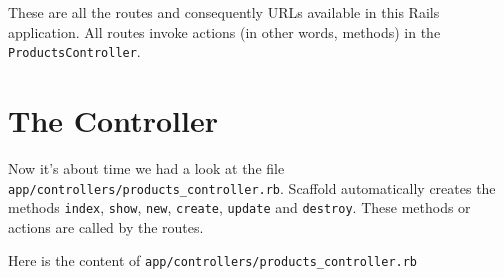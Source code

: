 \documentclass[a4paper]{book}
\begin{document}
These are all the routes and consequently URLs available in this Rails application. All routes invoke actions (in other words, methods) in the \texttt{ProductsController}.

\section{The Controller}\label{the-controller}

Now it's about time we had a look at the file \texttt{app/controllers/products\_controller.rb}. Scaffold automatically creates the methods \texttt{index}, \texttt{show}, \texttt{new}, \texttt{create}, \texttt{update} and \texttt{destroy}. These methods or actions are called by the routes.

Here is the content of \texttt{app/controllers/products\_controller.rb}
\end{document}
